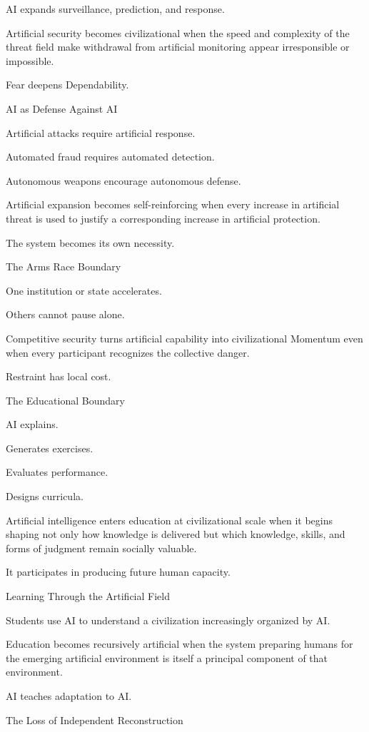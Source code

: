 AI expands surveillance, prediction, and response.

Artificial security becomes civilizational when the speed and complexity of the threat field make withdrawal from artificial monitoring appear irresponsible or impossible.

Fear deepens Dependability.

AI as Defense Against AI

Artificial attacks require artificial response.

Automated fraud requires automated detection.

Autonomous weapons encourage autonomous defense.

Artificial expansion becomes self-reinforcing when every increase in artificial threat is used to justify a corresponding increase in artificial protection.

The system becomes its own necessity.

The Arms Race Boundary

One institution or state accelerates.

Others cannot pause alone.

Competitive security turns artificial capability into civilizational Momentum even when every participant recognizes the collective danger.

Restraint has local cost.

The Educational Boundary

AI explains.

Generates exercises.

Evaluates performance.

Designs curricula.

Artificial intelligence enters education at civilizational scale when it begins shaping not only how knowledge is delivered but which knowledge, skills, and forms of judgment remain socially valuable.

It participates in producing future human capacity.

Learning Through the Artificial Field

Students use AI to understand a civilization increasingly organized by AI.

Education becomes recursively artificial when the system preparing humans for the emerging artificial environment is itself a principal component of that environment.

AI teaches adaptation to AI.

The Loss of Independent Reconstruction

